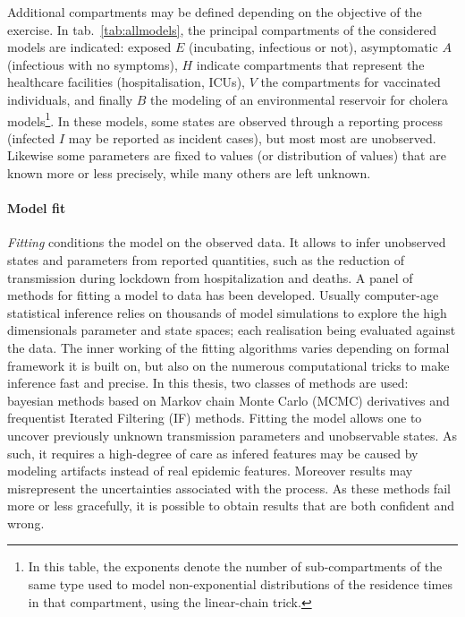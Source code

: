 Additional compartments may be defined depending on the objective of the exercise. In tab.~\ref{tab:allmodels}, the principal compartments of the considered models are indicated: exposed $E$ (incubating, infectious or not), asymptomatic $A$ (infectious with no symptoms), $H$ indicate compartments that represent the healthcare facilities (hospitalisation, ICUs), $V$ the compartments for vaccinated individuals, and finally $B$ the modeling of an environmental reservoir for cholera models\footnote{In this table, the exponents denote the number of sub-compartments of the same type used to model non-exponential distributions of the residence times in that compartment, using the linear-chain trick.}.
In these models, some states are observed through a reporting process (\eg infected $I$ may be reported as incident cases), but most most are unobserved. Likewise some parameters are fixed to values (or distribution of values) that are known more or less precisely, while many others are left unknown.

\paragraph{Model fit} \textit{Fitting} conditions the model on the observed data. It allows to infer unobserved states and parameters from reported quantities, such as the reduction of transmission during lockdown from hospitalization and deaths. A panel of methods for fitting a model to data has been developed. Usually computer-age statistical inference relies on thousands of model simulations to explore the high dimensionals parameter and state spaces; each realisation being evaluated against the data. The inner working of the fitting algorithms varies depending on formal framework it is built on, but also on the numerous computational tricks to make inference fast and precise. In this thesis, two classes of methods are used: bayesian methods based on Markov chain Monte Carlo (MCMC) derivatives and frequentist Iterated Filtering (IF) methods. Fitting the model allows one to uncover previously unknown transmission parameters and unobservable states. As such, it requires a high-degree of care as infered features may be caused by modeling artifacts instead of real epidemic features. Moreover results may misrepresent the uncertainties associated with the process. As these methods fail more or less gracefully, it is possible to obtain results that are both confident and wrong.
 
